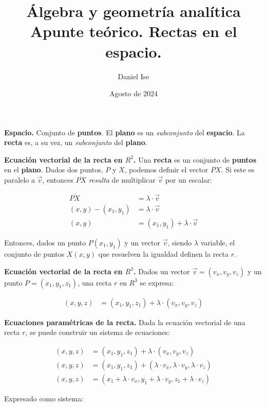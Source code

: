 \documentclass{article}
\title{Álgebra y geometría analítica\\Apunte teórico. Rectas en el espacio.}
\author{Daniel Ise}
\date{Agosto de 2024}
\begin{document}
\maketitle

\textbf{Espacio.} Conjunto de \textbf{puntos}. El \textbf{plano} es un
\textit{subconjunto} del \textbf{espacio}. La \textbf{recta} es, a su vez, un
\textit{subconjunto} del \textbf{plano}.

\textbf{Ecuación vectorial de la recta en \(R^2\).}
Una \textbf{recta} es un conjunto de \textbf{puntos} en el \textbf{plano}.
Dados dos puntos, $P$ y $X$,
podemos definir el vector \(\overline{PX}\).
Si este es paralelo a \(\vec{v}\),
entonces \(\overline{PX}\) \textit{resulta} de multiplicar \(\vec{v}\) por un
escalar:

\begin{align*}
    \overline{PX}     & = \lambda \cdot \vec{v}             \\
    (x,y) - (x_1,y_1) & = \lambda \cdot \vec{v}             \\
    (x,y)             & = (x_1,y_1) + \lambda \cdot \vec{v}
\end{align*}

Entonces, dados un punto $P (x_1,y_1)$ y un vector \(\vec{v}\),
siendo \(\lambda\) variable,
el conjunto de puntos \(X (x,y)\) que resuelven la igualdad definen la recta \(r\).

\textbf{Ecuación vectorial de la recta en \(R^3\).}
Dados un vector \(\vec{v} = (v_x,v_y,v_z)\) y un punto \(P = (x_1, y_1, z_1)\),
una recta \(r\) en \(R^3\) se expresa:

\begin{align*}
    (x, y, z) & = (x_1,y_1,z_1) + \lambda \cdot (v_x, v_y, v_z)
\end{align*}

\textbf{Ecuaciones paramétricas de la recta.}
Dada la ecuación vectorial de una recta \(r\),
se puede construir un sistema de ecuaciones:

\begin{align*}
    (x, y, z) & = (x_1,y_1,z_1) + \lambda \cdot (v_x, v_y, v_z)                               \\
    (x, y, z) & = (x_1,y_1,z_1) + (\lambda \cdot v_x, \lambda \cdot v_y,\lambda \cdot v_z)    \\
    (x, y, z) & = (x_1 + \lambda \cdot v_x, y_1 + \lambda \cdot v_y, z_1 + \lambda \cdot v_z)
\end{align*}

Expresado como sistema:
\end{document}
